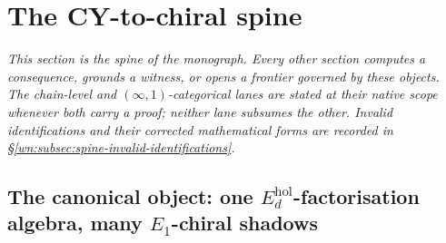 \providecommand{\kBKM}{\kappa_{\mathrm{BKM}}}
\providecommand{\kch}{\kappa_{\mathrm{ch}}}
\providecommand{\kcat}{\kappa_{\mathrm{cat}}}
\providecommand{\kfib}{\kappa_{\mathrm{fiber}}}
\providecommand{\kanom}{\kappa_{\mathrm{anom}}}
\providecommand{\ZZ}{\mathbb{Z}}
\providecommand{\CC}{\mathbb{C}}
\providecommand{\QQ}{\mathbb{Q}}
\providecommand{\CYcat}{\mathrm{CY}\text{-cat}}
\providecommand{\ChirAlg}{\mathrm{ChirAlg}}
\providecommand{\HolFA}{\mathrm{HolFA}}
\providecommand{\hCS}{\mathrm{hCS}}
\providecommand{\Obs}{\mathrm{Obs}}
\providecommand{\CEch}{\mathrm{CE}^{\bullet}_{\bar\partial,\mathrm{chir}}}
\providecommand{\Ufact}{\mathbf{U}^{\mathrm{fact}}}
\providecommand{\cF}{\mathcal{F}}
\providecommand{\cE}{\mathcal{E}}
\providecommand{\cA}{\mathcal{A}}
\providecommand{\cO}{\mathcal{O}}
\providecommand{\cL}{\mathcal{L}}
\providecommand{\cH}{\mathcal{H}}
\providecommand{\cW}{\mathcal{W}}
\providecommand{\cM}{\mathcal{M}}
\providecommand{\cV}{\mathcal{V}}
\providecommand{\fg}{\mathfrak{g}}
\providecommand{\Yplus}{Y^+_{\epsilon_1, \epsilon_2, \epsilon_3}}
\providecommand{\CoHA}{\mathrm{CoHA}}
\providecommand{\Winf}{\mathcal{W}_{1+\infty}}
\providecommand{\Mtf}{M_{24}}
\providecommand{\bH}{\mathbf{H}}
\providecommand{\FMcpt}{\mathrm{FM}_{\CC^3}}
\providecommand{\GRTone}{\mathrm{GRT}_1}
\providecommand{\Mpr}{\mathrm{Mp}}
\providecommand{\Spr}{\mathrm{Sp}}
\providecommand{\SOr}{\mathrm{SO}_+}
\providecommand{\Mukr}{\mathrm{Muk}}
\providecommand{\Wttl}{\widetilde{\Lambda}}
\providecommand{\LLeech}{\Lambda_{\mathrm{Leech}}}

\section{The CY-to-chiral spine}
\label{wn:sec:cy-to-chiral-spine}

\emph{This section is the spine of the monograph. Every other section
computes a consequence, grounds a witness, or opens a frontier governed
by these objects.  The chain-level and $(\infty,1)$-categorical lanes
are stated at their native scope whenever both carry a proof; neither
lane subsumes the other.  Invalid identifications and their corrected
mathematical forms are recorded in
\S\ref{wn:subsec:spine-invalid-identifications}.}

\subsection{The canonical object: one $E_d^{\mathrm{hol}}$-factorisation
algebra, many $E_1$-chiral shadows}
\label{wn:subsec:spine-canonical-object}

